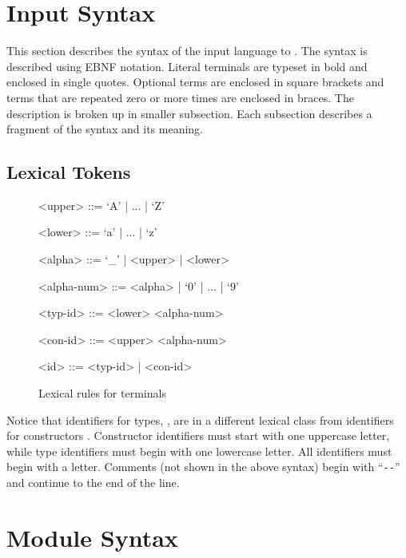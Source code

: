 %
\section{Input Syntax}
\label{sec:syntax}

This section describes the syntax of the input language to \asdlgen{}.
The syntax is described using EBNF notation.
Literal terminals are typeset in bold and enclosed in single quotes.
Optional terms are enclosed in square brackets and terms that are
repeated zero or more times are enclosed in braces.
The description is broken up in smaller subsection.
Each subsection describes a fragment of
the syntax and its meaning.

\subsection{Lexical Tokens}

\begin{figure}[t]
  \begin{center}
    \begin{grammar}
      <upper>     ::= `A' | ... | `Z'

      <lower>     ::= `a' | ... | `z'

      <alpha>     ::= `_' | <upper> | <lower>

      <alpha-num> ::= <alpha> | `0' | ... | `9'

      <typ-id>    ::= <lower> {<alpha-num>}

      <con-id>    ::= <upper> {<alpha-num>}

      <id>        ::= <typ-id> | <con-id>
    \end{grammar}
  \end{center}
  \caption{Lexical rules for \asdl{} terminals}
\end{figure}%

Notice that identifiers for types, , are in a different
lexical class from identifiers for constructors
. Constructor identifiers must start with one uppercase
letter, while type identifiers must begin with one lowercase
letter. All identifiers must begin with a letter.  Comments (not shown
in the above syntax) begin with ``\lstinline[language=ASDL]!--!''
and continue to the end of the line.

\section{Module Syntax}

